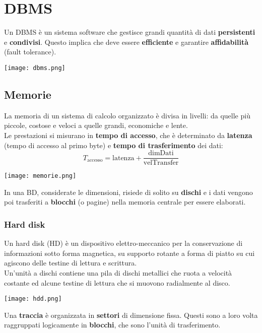 \newpage
\section{DBMS}
Un DBMS è un sistema software che gestisce grandi quantità di dati \textbf{persistenti} e \textbf{condivisi}. Questo implica che deve essere \textbf{efficiente} e garantire \textbf{affidabilità} (fault tolerance).
\begin{center}
	\texttt{[image: dbms.png]}
\end{center}

\subsection{Memorie}
La memoria di un sistema di calcolo organizzato è divisa in livelli: da quelle più piccole, costose e veloci a quelle grandi, economiche e lente.\\
Le prestazioni si misurano in \textbf{tempo di accesso}, che è determinato da \textbf{latenza} (tempo di accesso al primo byte) e \textbf{tempo di trasferimento} dei dati:
\begin{equation}
	T_{\text{accesso}} = \text{latenza} + \frac{\text{dimDati}}{\text{velTransfer}}
\end{equation}

\begin{center}
	\texttt{[image: memorie.png]}
\end{center}
In una BD, considerate le dimensioni, risiede di solito su \textbf{dischi} e i dati vengono poi trasferiti a \textbf{blocchi} (o pagine) nella memoria centrale per essere elaborati.
\subsubsection{Hard disk}
Un hard disk (HD) è un dispositivo elettro-meccanico per la conservazione di informazioni sotto forma magnetica, su supporto rotante a forma di piatto su cui agiscono delle testine di lettura e scrittura.\\
Un’unità a dischi contiene una pila di dischi metallici che ruota a velocità costante ed alcune testine di lettura che si muovono radialmente al disco.
\begin{center}
	\texttt{[image: hdd.png]}
\end{center}
Una \textbf{traccia} è organizzata in \textbf{settori} di dimensione fissa. Questi sono a loro volta raggruppati logicamente in \textbf{blocchi}, che sono l'unità di trasferimento.

